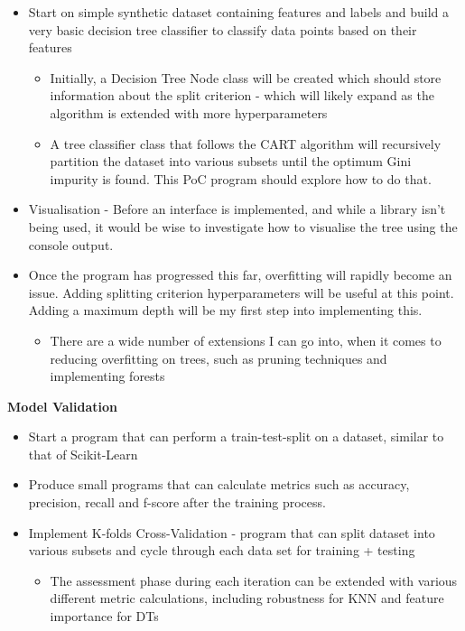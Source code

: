 \documentclass[report,10pt]{article}
\begin{document}
\begin{itemize}
    \item Start on simple synthetic dataset containing features and labels and build a very basic decision tree classifier to classify data points based on their features
    \begin{itemize}
        \item Initially, a Decision Tree Node class will be created which should store information about the split criterion - which will likely expand as the algorithm is extended with more hyperparameters
        \item A tree classifier class that follows the CART algorithm will recursively partition the dataset into various subsets until the optimum Gini impurity is found. This PoC program should explore how to do that.
    \end{itemize}
    \item Visualisation - Before an interface is implemented, and while a library isn't being used, it would be wise to investigate how to visualise the tree using the console output.
    \item Once the program has progressed this far, overfitting will rapidly become an issue. Adding splitting criterion hyperparameters will be useful at this point. Adding a maximum depth will be my first step into implementing this.
    \begin{itemize}
        \item There are a wide number of extensions I can go into, when it comes to reducing overfitting on trees, such as pruning techniques and implementing forests
    \end{itemize}
\end{itemize}
\textbf{Model Validation}
\begin{itemize}
    \item Start a program that can perform a train-test-split on a dataset, similar to that of Scikit-Learn
    \item Produce small programs that can calculate metrics such as accuracy, precision, recall and f-score after the training process.
    \item Implement K-folds Cross-Validation - program that can split dataset into various subsets and cycle through each data set for training + testing
    \begin{itemize}
        \item The assessment phase during each iteration can be extended with various different metric calculations, including robustness for KNN and feature importance for DTs
    \end{itemize}
\end{itemize}
\end{document}
